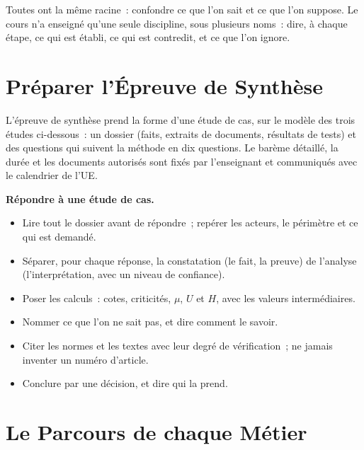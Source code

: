 Toutes ont la même racine~: confondre ce que l'on sait et ce que l'on
suppose. Le cours n'a enseigné qu'une seule discipline, sous plusieurs
noms~: dire, à chaque étape, ce qui est établi, ce qui est contredit, et ce
que l'on ignore.

\section{Préparer l'Épreuve de Synthèse}
\label{sec:c14-epreuve}

L'épreuve de synthèse prend la forme d'une étude de cas, sur le modèle des
trois études ci-dessous~: un dossier (faits, extraits de documents,
résultats de tests) et des questions qui suivent la méthode en dix
questions. Le barème détaillé, la durée et les documents autorisés sont
fixés par l'enseignant et communiqués avec le calendrier de l'UE.

\begin{boxprocedure}
\textbf{Répondre à une étude de cas.}
\begin{itemize}
    \item Lire tout le dossier avant de répondre~; repérer les acteurs, le
          périmètre et ce qui est demandé.
    \item Séparer, pour chaque réponse, la constatation (le fait, la preuve)
          de l'analyse (l'interprétation, avec un niveau de confiance).
    \item Poser les calculs~: cotes, criticités, $\mu$, $U$ et $H$, avec les
          valeurs intermédiaires.
    \item Nommer ce que l'on ne sait pas, et dire comment le savoir.
    \item Citer les normes et les textes avec leur degré de vérification~;
          ne jamais inventer un numéro d'article.
    \item Conclure par une décision, et dire qui la prend.
\end{itemize}
\end{boxprocedure}

\section{Le Parcours de chaque Métier}
\label{sec:c14-metiers}

